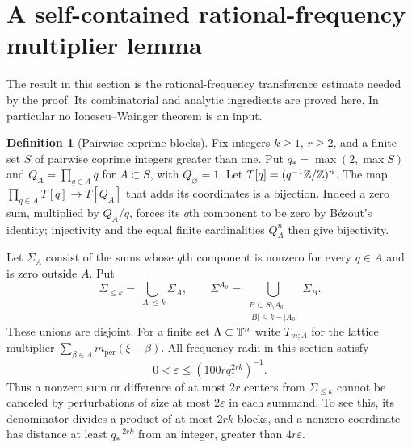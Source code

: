 \documentclass[11pt,oneside]{article}
\theoremstyle{definition}\newtheorem{definition}[theorem]{Definition}
\theoremstyle{remark}\newtheorem{remark}[theorem]{Remark}
\begin{document}
\section{A self-contained rational-frequency multiplier lemma}\label{sec:IW}
The result in this section is the rational-frequency transference estimate
needed by the proof. Its combinatorial and analytic ingredients are proved
here. In particular no Ionescu--Wainger theorem is an input.

\begin{definition}[Pairwise coprime blocks]\label{def:blocks}
Fix integers $k\geq1$, $r\geq2$, and a finite set $S$ of pairwise coprime
integers greater than one. Put $q_* =\max(2,\max S)$ and
$Q_A=\prod_{q\in A}q$ for $A\subset S$, with $Q_\varnothing=1$.
Let $T[q]=(q^{-1}\mathbb Z/\mathbb Z)^n$. The map
$\prod_{q\in A}T[q]\to T[Q_A]$ that adds its coordinates is a bijection.
Indeed a zero sum, multiplied by $Q_A/q$, forces its $q$th component to be
zero by B\'ezout's identity; injectivity and the equal finite cardinalities
$Q_A^n$ then give bijectivity.

Let $\Sigma_A$ consist of the sums whose $q$th component is nonzero for every
$q\in A$ and is zero outside $A$. Put
\[
 \Sigma_{\leq k}=\bigcup_{|A|\leq k}\Sigma_A,
 \qquad
 \Sigma^{A_0}=\bigcup_{\substack{B\subset S\setminus A_0\\|B|\leq k-|A_0|}}
                         \Sigma_B.
\]
These unions are disjoint. For a finite set $\Lambda\subset\mathbb T^n$ write
$T_{m;\Lambda}$ for the lattice multiplier
$\sum_{\beta\in\Lambda}m_{\mathrm{per}}(\xi-\beta)$.
All frequency radii in this section satisfy
\begin{equation}\label{eq:epsseparation}
 0<\varepsilon\leq (100r q_*^{2rk})^{-1}.
\end{equation}
Thus a nonzero sum or difference of at most $2r$ centers from
$\Sigma_{\leq k}$ cannot be canceled by perturbations of size at most
$2\varepsilon$ in each summand. To see this, its denominator divides a product
of at most $2rk$ blocks, and a nonzero coordinate has distance at least
$q_*^{-2rk}$ from an integer, greater than $4r\varepsilon$.
\end{definition}
\end{document}
